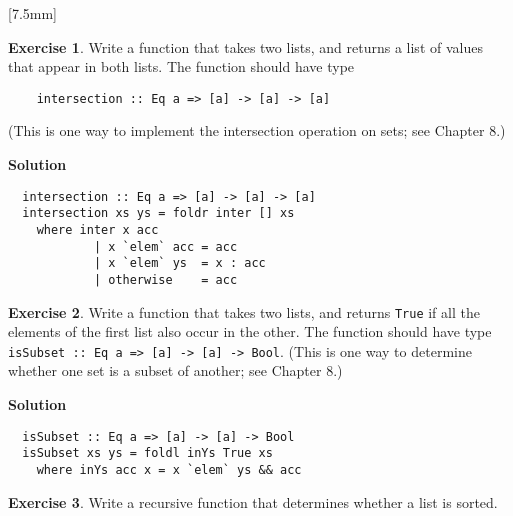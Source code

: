 \documentclass[11pt,a4paper]{article}
\theoremstyle{definition}
\newtheorem{exr}{Exercise}
\begin{document}
\vspace{2mm}
[7.5mm]

\begin{exr}
  Write a function that takes two lists, and returns a list of values that appear 
  in both lists. The function should have type 

  \begin{lstlisting}  
    intersection :: Eq a => [a] -> [a] -> [a]
  \end{lstlisting}

  (This is one way to implement the intersection operation on sets; see Chapter 8.)
\end{exr}

\textbf{Solution}
\begin{lstlisting}
  intersection :: Eq a => [a] -> [a] -> [a]                                       
  intersection xs ys = foldr inter [] xs                                          
    where inter x acc                                                             
            | x `elem` acc = acc                                                  
            | x `elem` ys  = x : acc                                              
            | otherwise    = acc  
\end{lstlisting}


\newpage

\begin{exr}
  Write a function that takes two lists, and returns \texttt{True} if all the 
  elements of the first list also occur in the other. The function should have 
  type \texttt{isSubset :: Eq a => [a] -> [a] -> Bool}. (This is one way to 
  determine whether one set is a subset of another; see Chapter 8.)
\end{exr}

\textbf{Solution}
\begin{lstlisting}
  isSubset :: Eq a => [a] -> [a] -> Bool
  isSubset xs ys = foldl inYs True xs
    where inYs acc x = x `elem` ys && acc
\end{lstlisting}


\vspace{5mm}

\begin{exr}
  Write a recursive function that determines whether a list is sorted.
\end{exr}
\end{document}
